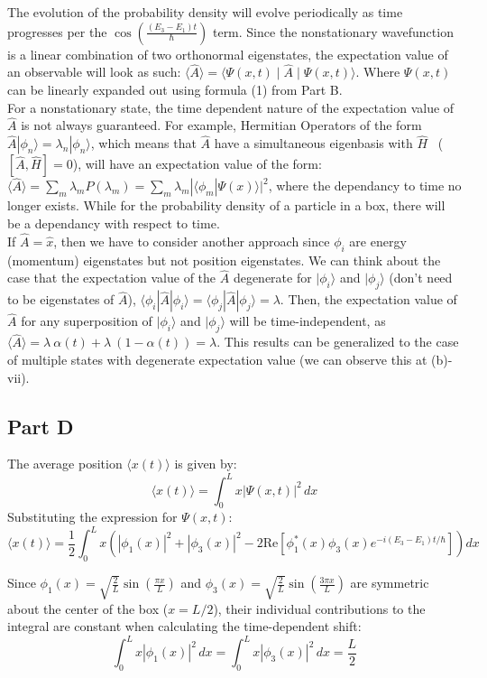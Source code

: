 \documentclass{article}
\begin{document}
\begin{adjustwidth}{5pt}{5pt}
\noindent The evolution of the probability density will evolve periodically as time progresses per the $\cos\left(\frac{(E_{3} - E_{1})t}{\hbar}\right)$ term. Since the nonstationary wavefunction is a linear combination of two orthonormal eigenstates, the expectation value of an observable will look as such: $\langle \hat{A} \rangle = \langle \Psi(x,t) \mid \hat{A} \mid \Psi(x,t) \rangle
$. Where $\Psi(x,t)$ can be linearly expanded out using formula (1) from Part B.\\ 
For a nonstationary state, the time dependent nature of the expectation value of $\hat{A}$ is not always guaranteed. For example, Hermitian Operators of the form $ \hat{A} | \phi_{n}\rangle = \lambda_{n} | \phi_{n} \rangle$, which means that $\hat{A}$ have a simultaneous eigenbasis with $\hat{H}$ ~($[\hat{A},\hat{H}]=0$), will have an expectation value of the form: $\langle \hat{A} \rangle = \sum_{m} \lambda_{m}P(\lambda_{m}) = \sum_{m} \lambda_{m}|\langle\phi_{m}|\Psi(x)\rangle |^2 $, where the dependancy to time no longer exists. While for the probability density of a particle in a box, there will be a dependancy with respect to time. \\
If $\hat{A}=\hat{x}$, then we have to consider another approach since $\phi_i$ are energy (momentum) eigenstates but not position eigenstates. We can think about the case that the expectation value of the $\hat{A}$ degenerate for $| 
\phi_i \rangle$ and $| 
\phi_j \rangle$ (don't need to be eigenstates of $\hat{A}$), $\langle \phi_i | \hat{A}|\phi_i\rangle = \langle \phi_j | \hat{A}|\phi_j\rangle = \lambda$. Then, the expectation value of $\hat{A}$ for any superposition of $| 
\phi_i \rangle$ and $| 
\phi_j \rangle$ will be time-independent, as $\langle \hat{A} \rangle = \lambda~\alpha(t) + \lambda~(1-\alpha(t)) = \lambda$. This results can be generalized to the case of multiple states with degenerate expectation value (we can observe this at (b)-vii).


\subsection*{Part D}
The average position $\langle x(t) \rangle$ is given by:
\[
\langle x(t) \rangle = \int_0^L x |\Psi(x, t)|^2 \, dx
\]
Substituting the expression for $\Psi(x, t)$:
\[
\langle x(t) \rangle = \frac{1}{2} \int_0^L x \left( |\phi_1(x)|^2 + |\phi_3(x)|^2 - 2 \text{Re}[\phi_1^*(x) \phi_3(x) e^{-i(E_3 - E_1) t/\hbar}] \right) dx
\]

\noindent Since $\phi_1(x) = \sqrt{\frac{2}{L}} \sin\left(\frac{\pi x}{L}\right)$ and $\phi_3(x) = \sqrt{\frac{2}{L}} \sin\left(\frac{3\pi x}{L}\right)$ are symmetric about the center of the box ($x = L/2$), their individual contributions to the integral are constant when calculating the time-dependent shift:
\[
\int_0^L x |\phi_1(x)|^2 \, dx = \int_0^L x |\phi_3(x)|^2 \, dx = \frac{L}{2}
\]


\end{adjustwidth}
\end{document}
